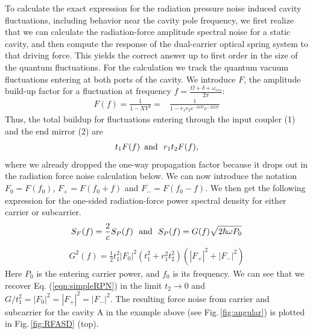 To calculate the exact expression for the radiation pressure noise induced cavity fluctuations, including behavior near the cavity pole frequency, we first realize that we can calculate the radiation-force amplitude spectral noise for a static cavity, and then compute the response of the dual-carrier optical spring system to that driving force. This yields the correct answer up to first order in the size of the quantum fluctuations. For the calculation we track the quantum vacuum fluctuations entering at both ports of the cavity. We introduce $F$, the amplitude build-up factor for a fluctuation at frequency $f = \frac{\Omega + \delta + \omega_{res}}{2 \pi}$:
\begin{align}
\label{eqn:RPNfunction}
F(f) = \frac{1}{1-XY^2}  =& \frac{1}{1-r_1r_2e^{-2 i \delta\tau}e^{-2 i \Omega\tau}}%
\end{align}
Thus, the total buildup for fluctuations entering through the input coupler (1) and the end mirror (2) are
\begin{align}
\label{eqn:RPNfunction12}
 t_1 F(f) \,\,\, {\rm and} \,\,\ r_1 t_2 F(f), 
\end{align}
where we already dropped the one-way propagation factor because it drops out in the radiation force noise calculation below. 
We can now introduce the notation $F_0=F(f_0)$, $F_+=F(f_0+f)$ and $F_-=F(f_0-f)$. We then get the following expression for the one-sided radiation-force power spectral density for either carrier or subcarrier.
\begin{align}
\label{eqn:RPN_P}
S_F (f) = \frac{2}{c} S_P (f) \,\,\,\, {\rm and} \,\,\,\, S_P(f) = G(f)\sqrt{2\hbar\omega P_0}
\end{align}
\begin{align}
\label{eqn:RPN}
G^2(f) = \frac{1}{2}t_1^2|F_0|^2 (t_1^2 \!\!+\! r_1^2t_2^2)( |F_+|^2 \!\!+\!  |F_-|^2) 
\end{align}
Here $P_0$ is the entering carrier power, and $f_0$ is its frequency. We can see that we recover Eq. (\ref{eqn:simpleRPN}) in the limit $t_2 \rightarrow 0$ and $G/t_1^2=|F_0|^2=|F_+|^2=|F_-|^2$. The resulting force noise from carrier and subcarrier for the cavity A in the example above (see Fig.\,\ref{fig:angular}) is plotted in Fig.\,\ref{fig:RFASD} (top).
